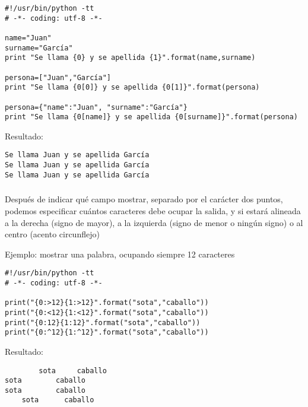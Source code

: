 \documentclass[ucs]{beamer}
\begin{document}
\begin{frame}[fragile]

  \begin{footnotesize}
  \begin{verbatim}
#!/usr/bin/python -tt
# -*- coding: utf-8 -*-

name="Juan"
surname="García"
print "Se llama {0} y se apellida {1}".format(name,surname) 

persona=["Juan","García"]
print "Se llama {0[0]} y se apellida {0[1]}".format(persona) 

persona={"name":"Juan", "surname":"García"}
print "Se llama {0[name]} y se apellida {0[surname]}".format(persona) 
  \end{verbatim}
  \end{footnotesize}

Resultado:

  \begin{footnotesize}
  \begin{verbatim}
Se llama Juan y se apellida García
Se llama Juan y se apellida García
Se llama Juan y se apellida García
  \end{verbatim}
  \end{footnotesize}
\end{frame}



\begin{frame}[fragile]
\frametitle{}
Después de indicar qué campo mostrar, separado por el 
carácter dos puntos,  podemos especificar
cuántos caracteres debe ocupar la salida, y si estará
alineada a la derecha (signo de mayor), a la izquierda
(signo de menor o ningún signo) o al centro (acento
circunflejo)

Ejemplo: mostrar una palabra, ocupando siempre 12
caracteres

  \begin{footnotesize}
  \begin{verbatim}
#!/usr/bin/python -tt
# -*- coding: utf-8 -*-

print("{0:>12}{1:>12}".format("sota","caballo"))
print("{0:<12}{1:<12}".format("sota","caballo"))
print("{0:12}{1:12}".format("sota","caballo"))
print("{0:^12}{1:^12}".format("sota","caballo"))
  \end{verbatim}
  \end{footnotesize}
Resultado:

  \begin{footnotesize}
  \begin{verbatim}
        sota     caballo
sota        caballo     
sota        caballo     
    sota      caballo 
  \end{verbatim}
  \end{footnotesize}
\end{frame}
\end{document}
